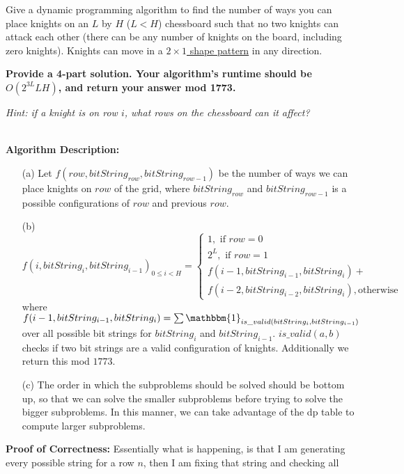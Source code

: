 \documentclass[11pt]{article}
\begin{document}
\newpage

Give a dynamic programming algorithm to find the number of ways you can place knights on an $L$ by $H$ ($L < H$) chessboard such that no two knights can attack each other (there can be any number of knights on the board, including zero knights). Knights can move in a \href{https://i.stack.imgur.com/Pebav.png}{$2 \times 1$ shape pattern} in any direction. 

\textbf{Provide a 4-part solution. Your algorithm's runtime should be $O(2^{3L}LH)$, and return your answer mod 1773.}

\emph{Hint: if a knight is on row $i$, what rows on the chessboard can it affect?}\\
\begin{solution}\\
    \textbf{Algorithm Description:}
    \begin{itemize}
        \item[(a)] Let $f(row, bitString_{row}, bitString_{row-1})$ be the number of ways we can place knights on $row$ of the grid, where $bitString_{row}$ and $bitString_{row-1}$ is a possible configurations of $row$ and previous $row$.
        \item[(b)]  
        $$
        f(i, bitString_i, bitString_{i-1})_{0 \le i < H}=
        \begin{cases}
        1, \text{ if $row=0$}\\
        2^L, \text{ if } row = 1\\
        f(i-1, bitString_{i-1}, bitString_{i}) + \\f(i-2, bitString_{i-2}, bitString_{i}), \text{otherwise}
        \end{cases}
        $$
        where $f(i-1, bitString_{i-1}, bitString_{i}) = \sum \mathbbm{1}_{is\_valid(bitString_i, bitString_{i-1})}$ over all possible bit strings for $bitString_{i}$ and $bitString_{i-1}$. $is\_valid(a, b)$ checks if two bit strings are a valid configuration of knights.
        Additionally we return this mod $1773$.
        \item[(c)] The order in which the subproblems should be solved should be bottom up, so that we can 
        solve the smaller subproblems before trying to solve the bigger subproblems. In this manner, we can take advantage of the dp table to compute larger subproblems.
    \end{itemize}
    \textbf{Proof of Correctness: }Essentially what is happening, is that I am generating every possible string for a row $n$, then I am fixing that string and checking all 

\end{solution}
\end{document}
